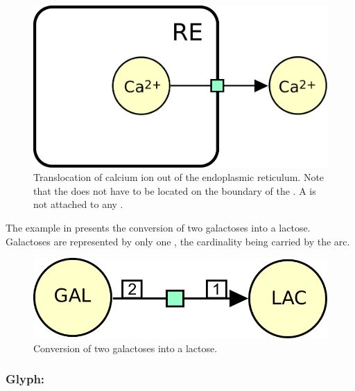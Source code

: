 \begin{figure}[H]
  \centering
  \includegraphics[scale = 0.5]{le_images/process-translocation}
  \caption{Translocation of calcium ion out of the endoplasmic reticulum. Note that the  does not have to be located on the boundary of the . A  is not attached to any .}
  \label{fig:trans-trans}
\end{figure}

The example in  presents the conversion of two galactoses into a lactose.  Galactoses are represented by only one , the cardinality being carried by the  arc.

\begin{figure}[H]
  \centering
  \includegraphics[scale = 0.5]{le_images/process-dimerisation}
  \caption{Conversion of two galactoses into a lactose.}
  \label{fig:trans-dim}
\end{figure}

\subsubsection{Glyph: }\label{sec:omitted}

